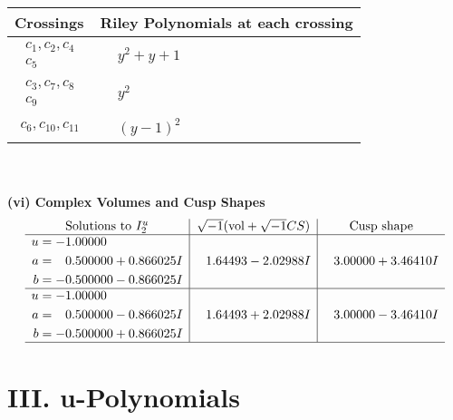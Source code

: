 \documentclass[1p]{elsarticle_modified}
\theoremstyle{definition}
\newcommand{\I}{\sqrt{-1}}
\begin{document}
\begin{tabular}{m{50pt}|m{274pt}}
Crossings & \hspace{64pt}Riley Polynomials at each crossing \\
\hline $$\begin{aligned}c_{1},c_{2},c_{4}\\c_{5}\end{aligned}$$&$\begin{aligned}
&y^2+y+1
\end{aligned}$\\
\hline $$\begin{aligned}c_{3},c_{7},c_{8}\\c_{9}\end{aligned}$$&$\begin{aligned}
&y^2
\end{aligned}$\\
\hline $$\begin{aligned}c_{6},c_{10},c_{11}\end{aligned}$$&$\begin{aligned}
&(y-1)^2
\end{aligned}$\\
\hline
\end{tabular}\\~\\
\newpage\flushleft \textbf{(vi) Complex Volumes and Cusp Shapes}
$$\begin{array}{c|c|c}  
\text{Solutions to }I^u_{2}& \I (\text{vol} + \sqrt{-1}CS) & \text{Cusp shape}\\
 \hline 
\begin{aligned}
u &= -1.00000\phantom{ +0.000000I} \\
a &= \phantom{-}0.500000 + 0.866025 I \\
b &= -0.500000 - 0.866025 I\end{aligned}
 & \phantom{-}1.64493 - 2.02988 I & \phantom{-}3.00000 + 3.46410 I \\ \hline\begin{aligned}
u &= -1.00000\phantom{ +0.000000I} \\
a &= \phantom{-}0.500000 - 0.866025 I \\
b &= -0.500000 + 0.866025 I\end{aligned}
 & \phantom{-}1.64493 + 2.02988 I & \phantom{-}3.00000 - 3.46410 I\\
 \hline 
 \end{array}$$\newpage
\newpage\renewcommand{\arraystretch}{1}
\centering \section*{ III. u-Polynomials}
\end{document}
